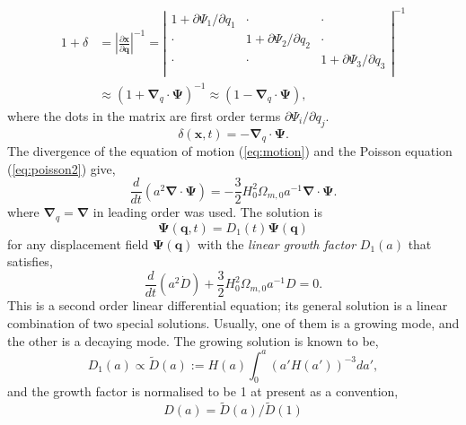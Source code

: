 \documentclass[a4paper]{article}
\begin{document}
\begin{align}
  1 + \delta
    &= \left| \frac{\partial \bm{x}}{\partial \bm{q}} \right|^{-1}
     = \left|
         \begin{array}{ccc}
           1 + \partial \Psi_1/\partial q_1 & \cdot & \cdot  \\
           \cdot &  1 + \partial \Psi_2/\partial q_2 & \cdot \\
          \cdot &  \cdot & 1 + \partial \Psi_3/\partial q_3 \\
         \end{array}
       \right|^{-1}\\
       &\approx (1 + \bm{\nabla}_q \cdot \bm{\Psi})^{-1}
       \approx (1 - \bm{\nabla}_q \cdot \bm{\Psi}),
\end{align}
where the dots in the matrix are first order terms $\partial
\Psi_i/\partial q_j$.
\begin{equation}
  \delta(\bm{x}, t) = - \bm{\nabla}_q \cdot \bm{\Psi}.
\end{equation}
The divergence of the equation of motion (\ref{eq:motion}) and the
Poisson equation (\ref{eq:poisson2}) give,
\begin{equation}
  \frac{d}{dt} \left( a^2 \bm{\nabla}\cdot\bm{\Psi} \right)
  = -\frac{3}{2} H_0^2 \Omega_{m,0} a^{-1} \bm{\nabla}\cdot\bm{\Psi}.
\end{equation}
where $\bm{\nabla}_q = \bm{\nabla}$ in leading order was used.
The solution is
\begin{equation}
  \bm{\Psi}(\bm{q}, t) = D_1(t) \bm{\Psi}(\bm{q})
\end{equation}
for any displacement field $\bm{\Psi}(\bm{q})$ with the \textit{linear growth factor} $D_1(a)$ that satisfies,
\begin{equation}
  \frac{d}{dt}\left( a^2 \dot{D} \right)
  + \frac{3}{2} H_0^2 \Omega_{m,0} a^{-1} D = 0.
\end{equation}
This is a second order linear differential equation; its general
solution is a linear combination of two special solutions. Usually,
one of them is a growing mode, and the other is a decaying mode. The
growing solution is known to be,
\begin{equation}
  D_1(a) \propto \tilde{D}(a) := H(a) \int_0^a \left( a'H(a') \right)^{-3} da',
\end{equation}
and the growth factor is normalised to be 1 at present as a convention,
\begin{equation}
  D(a) = \tilde{D}(a)/\tilde{D}(1)
\end{equation}
\end{document}
